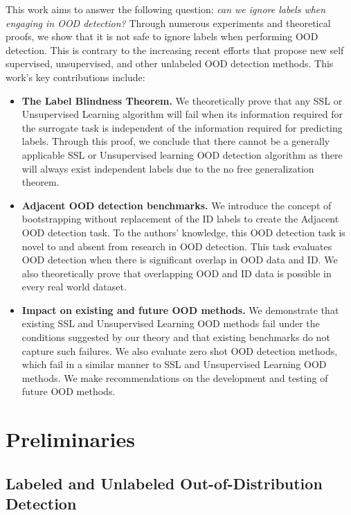 \documentclass[11pt, oneside]{book}
\theoremstyle{plain}
\theoremstyle{definition}
\theoremstyle{remark}
\begin{document}
This work aims to answer the following question: \emph{can we ignore labels when engaging in OOD detection?} Through numerous experiments and theoretical proofs, we show that it is not safe to ignore labels when performing OOD detection. This is contrary to the increasing recent efforts that propose new self supervised, unsupervised, and other unlabeled OOD detection methods. This work's key contributions include:
\begin{itemize}
\item \textbf{The Label Blindness Theorem.} We theoretically prove that any SSL or Unsupervised Learning algorithm will fail when its information required for the surrogate task is independent of the information required for predicting labels. Through this proof, we conclude that there cannot be a generally applicable SSL or Unsupervised learning OOD detection algorithm as there will always exist independent labels due to the no free generalization theorem.

\item \textbf{Adjacent OOD detection benchmarks.} We introduce the concept of bootstrapping without replacement of the ID labels to create the Adjacent OOD detection task. To the authors' knowledge, this OOD detection task is novel to and absent from research in OOD detection. This task evaluates OOD detection when there is significant overlap in OOD data and ID. We also theoretically prove that overlapping OOD and ID data is possible in every real world dataset.

\item \textbf{Impact on existing and future OOD methods.} We demonstrate that existing SSL and Unsupervised Learning OOD methods fail under the conditions suggested by our theory and that existing benchmarks do not capture such failures. We also evaluate zero shot OOD detection methods, which fail in a similar manner to SSL and Unsupervised Learning OOD methods. We make recommendations on the development and testing of future OOD methods.
\end{itemize}

\section{Preliminaries}

\subsection{Labeled and Unlabeled Out-of-Distribution Detection}
\end{document}
